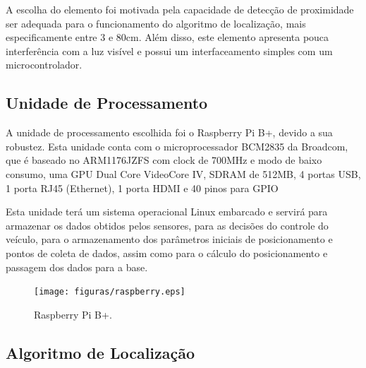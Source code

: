   A escolha do elemento foi motivada pela capacidade de detecção
  de proximidade ser adequada para o funcionamento do algoritmo
  de localização, mais especificamente entre 3 e 80cm.  Além disso,
  este elemento apresenta pouca interferência com a luz visível e
  possui um interfaceamento simples com um microcontrolador.

  \subsection{Unidade de Processamento}

  A unidade de processamento escolhida foi o Raspberry Pi B+,
  devido a sua robustez. Esta unidade conta com o microprocessador
  BCM2835 da Broadcom, que é baseado no ARM1176JZFS com clock de
  700MHz e modo de baixo consumo, uma GPU Dual Core VideoCore
  IV\textregistered, SDRAM de 512MB, 4 portas USB, 1 porta RJ45
  (Ethernet), 1 porta HDMI e 40 pinos para GPIO~\cite{raspref}

  Esta unidade terá um sistema operacional Linux embarcado e
  servirá para armazenar os dados obtidos pelos sensores, para
  as decisões do controle do veículo, para o armazenamento dos
  parâmetros iniciais de posicionamento e pontos de coleta de
  dados, assim como para o cálculo do posicionamento e passagem
  dos dados para a base.

  \begin{figure}[!htbp]
  \begin{center}
  \texttt{[image: figuras/raspberry.eps]}
  \caption{\label{fig:raspberry}Raspberry Pi B+.}
  \end{center}
  \end{figure}

  \subsection{Algoritmo de Localização}

